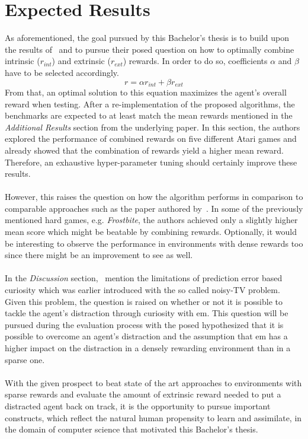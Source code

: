 \documentclass[draft,final]{vutinfth} %
\begin{document}
    \section{Expected Results}\label{sec:expected-results}
    As aforementioned, the goal pursued by this Bachelor's thesis is to build upon the results of~\citeauthor{burda_large-scale_2018-1} and to pursue their posed question on how to optimally combine intrinsic ($r_{int}$) and extrinsic ($r_{ext}$) rewards.
    In order to do so, coefficients $\alpha$ and $\beta$ have to be selected accordingly.
    \[r=\alpha r_{int} + \beta r_{ext}\]
    From that, an optimal solution to this equation maximizes the agent's overall reward when testing.
    After a re-implementation of the proposed algorithms, the benchmarks are expected to at least match the mean rewards mentioned in the \textit{Additional Results} section from the underlying paper.
    In this section, the authors explored the performance of combined rewards on five different Atari games and already showed that the combination of rewards yield a higher mean reward.
    Therefore, an exhaustive hyper-parameter tuning should certainly improve these results.
    \\\\
    However, this raises the question on how the algorithm performs in comparison to comparable approaches such as the paper authored by~\cite{kim_emi_2019}.
    In some of the previously mentioned hard games, e.g. \textit{Frostbite}, the authors achieved only a slightly higher mean score which might be beatable by combining rewards.
    Optionally, it would be interesting to observe the performance in environments with dense rewards too since there might be an improvement to see as well.
    \\\\
    In the \textit{Discussion} section,~\citeauthor{burda_large-scale_2018-1} mention the limitations of prediction error based curiosity which was earlier introduced with the so called noisy-TV problem.
    Given this problem, the question is raised on whether or not it is possible to tackle the agent's distraction through curiosity with \gls{em}.
    This question will be pursued during the evaluation process with the posed hypothesized that it is possible to overcome an agent's distraction and the assumption that \gls{em} has a higher impact on the distraction in a densely rewarding environment than in a sparse one.
    \\\\
    With the given prospect to beat state of the art approaches to environments with sparse rewards and evaluate the amount of extrinsic reward needed to put a distracted agent back on track, it is the opportunity to pursue important constructs, which reflect the natural human propensity to learn and assimilate, in the domain of computer science that motivated this Bachelor's thesis.
\end{document}
